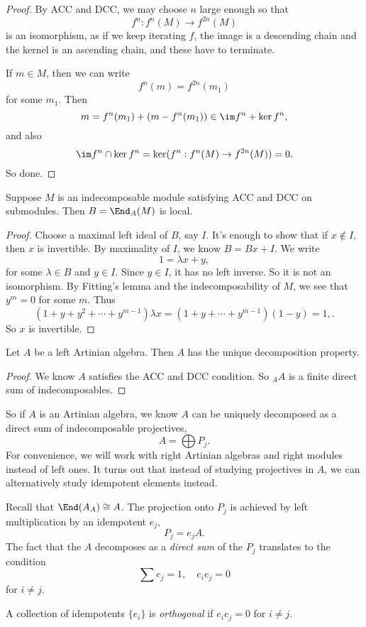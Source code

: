 \documentclass[a4paper]{article}
\begin{document}
\begin{proof}
  By ACC and DCC, we may choose $n$ large enough so that
  \[
    f^n: f^n(M) \to f^{2n}(M)
  \]
  is an isomorphism, as if we keep iterating $f$, the image is a descending chain and the kernel is an ascending chain, and these have to terminate.

  If $m \in M$, then we can write
  \[
    f^n(m) = f^{2n}(m_1)
  \]
  for some $m_1$. Then
  \[
    m = f^n(m_1) + (m - f^n(m_1)) \in \im f^n + \ker f^n,
  \]
  and also
  \[
    \im f^n \cap \ker f^n = \ker (f^n: f^n(M) \to f^{2n}(M)) = 0.
  \]
  So done.
\end{proof}

\begin{lemma}
  Suppose $M$ is an indecomposable module satisfying ACC and DCC on submodules. Then $B = \End_A(M)$ is local.
\end{lemma}

\begin{proof}
  Choose a maximal left ideal of $B$, say $I$. It's enough to show that if $x \not \in I$, then $x$ is invertible. By maximality of $I$, we know $B = Bx + I$. We write
  \[
    1 = \lambda x + y,
  \]
  for some $\lambda \in B$ and $y \in I$. Since $y \in I$, it has no left inverse. So it is not an isomorphism. By Fitting's lemma and the indecomposability of $M$, we see that $y^m = 0$ for some $m$. Thus
  \[
    (1 + y + y^2 + \cdots + y^{m - 1}) \lambda x = (1 + y + \cdots + y^{m - 1})(1 - y) = 1,.
  \]
  So $x$ is invertible.
\end{proof}

\begin{cor}
  Let $A$ be a left Artinian algebra. Then $A$ has the unique decomposition property.
\end{cor}

\begin{proof}
  We know $A$ satisfies the ACC and DCC condition. So $_A A$ is a finite direct sum of indecomposables.
\end{proof}

So if $A$ is an Artinian algebra, we know $A$ can be uniquely decomposed as a direct sum of indecomposable projectives,
\[
  A = \bigoplus P_j.
\]
For convenience, we will work with right Artinian algebras and right modules instead of left ones. It turns out that instead of studying projectives in $A$, we can alternatively study idempotent elements instead.

Recall that $\End(A_A) \cong A$. The projection onto $P_j$ is achieved by left multiplication by an idempotent $e_j$,
\[
  P_j = e_j A.
\]
The fact that the $A$ decomposes as a \emph{direct sum} of the $P_j$ translates to the condition
\[
  \sum e_j = 1,\quad e_i e_j = 0
\]
for $i \not= j$.
\begin{defi}
  A collection of idempotents $\{e_i\}$ is \emph{orthogonal} if $e_i e_j = 0$ for $i \not= j$.
\end{defi}
\end{document}
